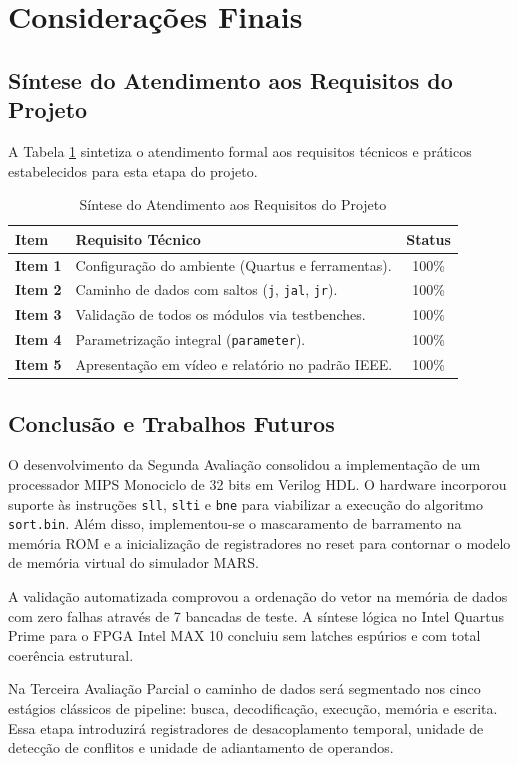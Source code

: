 \section{Considerações Finais}

\subsection{Síntese do Atendimento aos Requisitos do Projeto}
A Tabela \ref{tab:requisitos} sintetiza o atendimento formal aos requisitos técnicos e práticos estabelecidos para esta etapa do projeto.

\begin{table}[htbp]
\centering
\caption{Síntese do Atendimento aos Requisitos do Projeto}
\label{tab:requisitos}
\scriptsize
\setlength{\tabcolsep}{3pt}
\begin{tabular}{lp{4.2cm}c}
\toprule
\textbf{Item} & \textbf{Requisito Técnico} & \textbf{Status} \\
\midrule
\textbf{Item 1} & Configuração do ambiente (Quartus e ferramentas). & 100\% \\
\textbf{Item 2} & Caminho de dados com saltos (\texttt{j}, \texttt{jal}, \texttt{jr}). & 100\% \\
\textbf{Item 3} & Validação de todos os módulos via testbenches. & 100\% \\
\textbf{Item 4} & Parametrização integral (\texttt{parameter}). & 100\% \\
\textbf{Item 5} & Apresentação em vídeo e relatório no padrão IEEE. & 100\% \\
\bottomrule
\end{tabular}
\end{table}

\subsection{Conclusão e Trabalhos Futuros}
O desenvolvimento da Segunda Avaliação consolidou a implementação de um processador MIPS Monociclo de 32 bits em Verilog HDL. O hardware incorporou suporte às instruções \texttt{sll}, \texttt{slti} e \texttt{bne} para viabilizar a execução do algoritmo \texttt{sort.bin}. Além disso, implementou-se o mascaramento de barramento na memória ROM e a inicialização de registradores no reset para contornar o modelo de memória virtual do simulador MARS.

A validação automatizada comprovou a ordenação do vetor na memória de dados com zero falhas através de 7 bancadas de teste. A síntese lógica no Intel Quartus Prime para o FPGA Intel MAX 10 concluiu sem latches espúrios e com total coerência estrutural.

Na Terceira Avaliação Parcial o caminho de dados será segmentado nos cinco estágios clássicos de pipeline: busca, decodificação, execução, memória e escrita. Essa etapa introduzirá registradores de desacoplamento temporal, unidade de detecção de conflitos e unidade de adiantamento de operandos.

